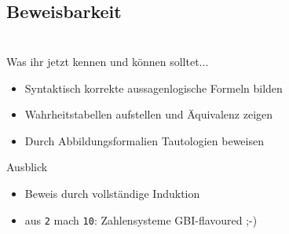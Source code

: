 \subsection{Beweisbarkeit}



\section{}
	\begin{frame}{Was ihr jetzt kennen und können solltet...}
			\begin{itemize}
				\item Syntaktisch korrekte aussagenlogische Formeln bilden
				\item Wahrheitstabellen aufstellen und Äquivalenz zeigen
				\item Durch Abbildungsformalien Tautologien beweisen
			\end{itemize}
	
	\end{frame}
	\begin{frame}{Ausblick}
		\begin{itemize}
			\item Beweis durch vollständige Induktion
			\item aus \verb+2+ mach \verb+10+: Zahlensysteme GBI-flavoured ;-)
		\end{itemize}
	\end{frame}
\section{}
\questionframe
\lastframe
{}
